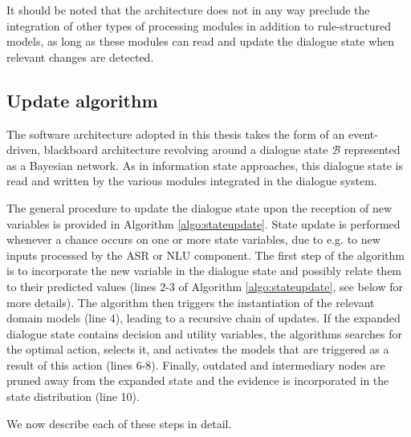 It should be noted that the architecture does not in any way preclude the integration of other types of processing modules in addition to rule-structured models, as long as these modules can read and update the dialogue state when relevant changes are detected. 

\subsection{Update algorithm} 

The software architecture adopted in this thesis takes the form of an event-driven, blackboard architecture \citep{jaspis2004,Buckley:2006} revolving around a dialogue state $\mathcal{B}$ represented as a Bayesian network.  As in information state approaches, this dialogue state is read and written by the various modules integrated in the dialogue system. 

The general procedure to update the dialogue state upon the reception of new variables is provided in Algorithm \ref{algo:stateupdate}. State update is performed whenever a chance occurs on one or more state variables, due to e.g. to new inputs processed by the ASR or NLU component. The first step of the algorithm is to incorporate the new variable in the dialogue state and possibly relate them to their predicted values (lines 2-3 of Algorithm \ref{algo:stateupdate}, see below for more details). The algorithm then triggers the instantiation of the relevant domain models (line 4), leading to a recursive chain of updates.  If the expanded dialogue state contains decision and utility variables, the algorithms searches for the optimal action, selects it, and activates the models that are triggered as a result of this action  (lines 6-8). Finally, outdated and intermediary nodes are pruned away from the expanded state and the evidence is incorporated in the state distribution (line 10). 

We now describe each of these steps in detail.

